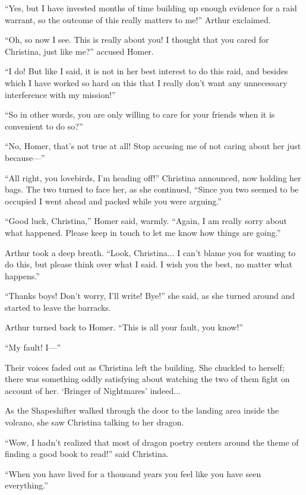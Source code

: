 \documentclass[showtrims,b6paper,draft,10pt]{memoir}
\begin{document}
``Yes, but I have invested months of time building up enough evidence for a raid warrant, so the outcome of this really matters to me!'' Arthur exclaimed.

``Oh, so now I see.  This is really about you!  I thought that you cared for Christina, just like me?'' accused Homer.

``I do!  But like I said, it is not in her best interest to do this raid, and besides which I have worked so hard on this that I really don't want any unnecessary interference with my mission!''

``So in other words, you are only willing to care for your friends when it is convenient to do so?''

``No, Homer, that's not true at all!  Stop accusing me of not caring about her just because---''

``All right, you lovebirds, I'm heading off!''  Christina announced, now holding her bags.  The two turned to face her, as she continued, ``Since you two seemed to be occupied I went ahead and packed while you were arguing.''

``Good luck, Christina,''  Homer said, warmly.  ``Again, I am really sorry about what happened.  Please keep in touch to let me know how things are going.''

Arthur took a deep breath.  ``Look, Christina... I can't blame you for wanting to do this, but please think over what I said.  I wish you the best, no matter what happens.''

``Thanks boys!  Don't worry, I'll write!  Bye!''  she said, as she turned around and started to leave the barracks.

Arthur turned back to Homer.  ``This is all your fault, you know!''

``My fault!  I---''

Their voices faded out as Christina left the building.  She chuckled to herself;  there was something oddly satisfying about watching the two of them fight on account of her.  `Bringer of Nightmares' indeed...

\timeskip
As the Shapeshifter walked through the door to the landing area inside the volcano, she saw Christina talking to her dragon.

``Wow, I hadn't realized that most of dragon poetry centers around the theme of finding a good book to read!'' said Christina.

``When you have lived for a thousand years you feel like you have seen everything.''
\end{document}
